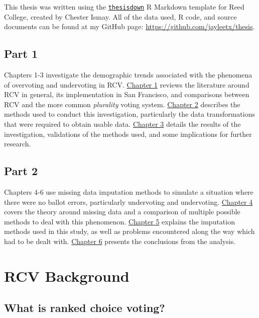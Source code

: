 \documentclass[12pt,twoside]{reedthesis}
\begin{document}
This thesis was written using the \href{https://github.com/ismayc/thesisdown}{\texttt{thesisdown}} R Markdown template for Reed College, created by Chester Ismay. All of the data used, R code, and source documents can be found at my GitHub page: \url{https://github.com/jayleetx/thesis}.

\hypertarget{part-1}{%
\section*{Part 1}\label{part-1}}

Chapters 1-3 investigate the demographic trends associated with the phenomena of overvoting and undervoting in RCV.
\protect\hyperlink{demo-litreview}{Chapter 1} reviews the literature around RCV in general, its implementation in San Francisco, and comparisons between RCV and the more common \emph{plurality} voting system.
\protect\hyperlink{demo-methods}{Chapter 2} describes the methods used to conduct this investigation, particularly the data transformations that were required to obtain usable data.
\protect\hyperlink{demo-results}{Chapter 3} details the results of the investigation, validations of the methods used, and some implications for further research.

\hypertarget{part-2}{%
\section*{Part 2}\label{part-2}}

Chapters 4-6 use missing data imputation methods to simulate a situation where there were no ballot errors, particularly undervoting and undervoting.
\protect\hyperlink{missing-litreview}{Chapter 4} covers the theory around missing data and a comparison of multiple possible methods to deal with this phenomenon.
\protect\hyperlink{missing-methods}{Chapter 5} explains the imputation methods used in this study, as well as problems encountered along the way which had to be dealt with.
\protect\hyperlink{missing-results}{Chapter 6} presents the conclusions from the analysis.

\hypertarget{demo-litreview}{%
\chapter{RCV Background}\label{demo-litreview}}

\hypertarget{what-is-ranked-choice-voting}{%
\section{What is ranked choice voting?}\label{what-is-ranked-choice-voting}}
\end{document}
